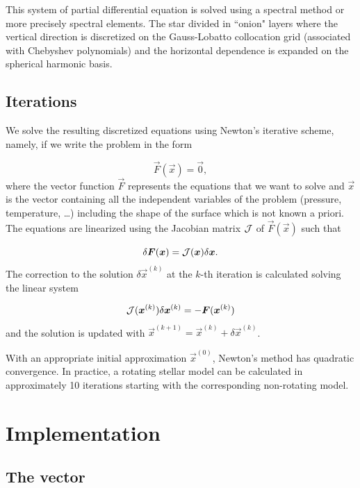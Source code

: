 This system of partial differential equation is solved using a spectral
method or more precisely spectral elements. The star divided in
``onion" layers where the vertical direction is discretized on the
Gauss-Lobatto collocation grid (associated with Chebyshev polynomials)
and the horizontal dependence is expanded on the spherical harmonic
basis.

\subsection{Iterations}

We solve the resulting discretized equations using Newton's iterative
scheme, namely, if  we write the problem in the form

\begin{equation}
\vec F(\vec x)=\vec 0 ,
\end{equation}
where the vector function $\vec F$ represents the equations that we
want to solve and $\vec x$ is the vector containing all the independent
variables of the problem (pressure, temperature, \ldots) including the
shape of the surface which is not known a priori.  The equations are
linearized using the Jacobian matrix $\mathcal{J}$ of $\vec F(\vec x)$ such
that

\begin{equation}
\delta\vec F(\vec x)=\tens J (\vec x) \delta\vec x .
\end{equation}
The correction to the solution $\delta \vec x^{(k)}$ at the $k$-th
iteration is calculated solving the linear system

\begin{equation}
\tens J(\vec x^{(k)})\delta \vec x^{(k)}=-\vec F(\vec x^{(k)})
\end{equation}
and the solution is updated with
$\vec x^{(k+1)}=\vec x^{(k)}+\delta \vec x^{(k)}$.

With an appropriate initial approximation $\vec x^{(0)}$, Newton's method
has quadratic convergence. In practice, a rotating stellar model can be
calculated in approximately 10 iterations starting with the corresponding
non-rotating model.

\section{Implementation}

\subsection{The vector}

